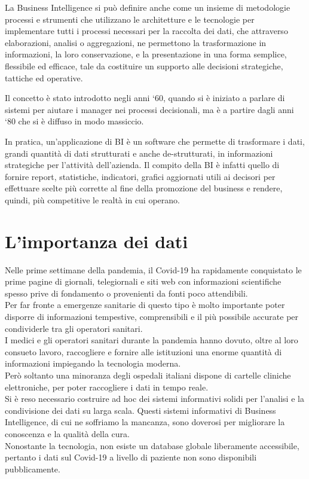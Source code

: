 \noindent La Business Intelligence si può definire anche come un insieme di metodologie processi e strumenti che utilizzano le architetture e le tecnologie per implementare tutti i processi necessari per la raccolta dei dati, che attraverso elaborazioni, analisi o aggregazioni, ne permettono la trasformazione in informazioni, la loro conservazione, e la presentazione in una forma semplice, flessibile ed efficace, tale da costituire un supporto alle decisioni strategiche, tattiche ed operative.
 
\noindent Il concetto è stato introdotto negli anni ‘60, quando si è iniziato a parlare di sistemi per aiutare i manager nei processi decisionali, ma è a partire dagli anni ‘80 che si è diffuso in modo massiccio.
 
\noindent In pratica, un'applicazione di BI è un software che permette di trasformare i dati, grandi quantità di dati strutturati e anche de-strutturati, in informazioni strategiche per l'attività dell'azienda. Il compito della BI è infatti quello di fornire report, statistiche, indicatori, grafici aggiornati utili ai decisori per effettuare scelte più corrette al fine della promozione del business e rendere, quindi, più competitive le realtà in cui operano.


\section{L'importanza dei dati}
Nelle prime settimane della pandemia, il Covid-19 ha rapidamente conquistato le prime pagine di giornali, telegiornali e siti web con informazioni scientifiche spesso prive di fondamento o provenienti da fonti poco attendibili.\\
\noindent Per far fronte a emergenze sanitarie di questo tipo è molto importante poter disporre di informazioni tempestive, comprensibili e il più possibile accurate per condividerle tra gli operatori sanitari.\\
I medici e gli operatori sanitari durante la pandemia hanno dovuto, oltre al loro consueto lavoro, raccogliere e fornire alle istituzioni una enorme quantità di informazioni impiegando la tecnologia moderna.\\
Però soltanto una minoranza degli ospedali italiani dispone di cartelle cliniche elettroniche, per poter raccogliere i dati in tempo reale.\\
Si è reso necessario costruire ad hoc dei sistemi informativi solidi per l’analisi e la condivisione dei dati su larga scala.
Questi sistemi informativi di Business Intelligence, di cui ne soffriamo la mancanza, sono doverosi per migliorare la conoscenza e la qualità della cura.\\
Nonostante la tecnologia, non esiste un database globale liberamente accessibile, pertanto i dati sul Covid-19 a livello di paziente non sono disponibili pubblicamente.





